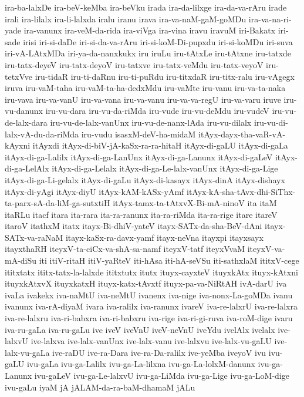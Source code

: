 {ira-ba-lalxDe
ira-beV-keMba
ira-beVku
irada
ira-da-lilxge
ira-da-va-rAru
irade
irali
ira-lilalx
ira-li-lalxda
iralu
iranu
irava
ira-va-naM-gaM-goMDu
ira-va-na-ri-yade
ira-vanunx
ira-veM-da-rida
ira-viVga
ira-vina
iravu
iravuM
iri-Bakatx
iri-sade
irisi
iri-si-daDe
iri-si-da-va-rAru
iri-si-koM-Di-pupxdu
iri-si-koMDu
iri-suva
iri-vA-LAtxMDa
iri-ya-da-nanxkukx
iru
iruLu
iru-tAtxLe
iru-tAtxne
iru-tatxde
iru-tatx-deyeV
iru-tatx-deyoV
iru-tatxve
iru-tatx-veMdu
iru-tatx-veyoV
iru-tetxVve
iru-tidaR
iru-ti-daRnu
iru-ti-puRdu
iru-titxdaR
iru-titx-ralu
iru-vAgegx
iruva
iru-vaM-taha
iru-vaM-ta-ha-dedxMdu
iru-vaMte
iru-vanu
iru-va-ta-naka
iru-vava
iru-va-vanU
iru-va-vana
iru-va-vanu
iru-va-va-regU
iru-va-varu
iruve
iru-vu-danunx
iru-vu-dara
iru-vu-da-riMda
iru-vude
iru-vu-deMdu
iru-vudeV
iru-vu-de-lalx-dara
iru-vu-de-lalx-vanUnx
iru-vu-de-nanx-lAda
iru-vu-dilalx
iru-vu-di-lalx-vA-du-da-riMda
iru-vudu
isasxM-deV-ha-midaM
itAyx-dayx-tha-vaR-vA-kAyxni
itAyxdi
itAyx-di-biV-jA-kaSx-ra-ra-hitaH
itAyx-di-gaLU
itAyx-di-gaLa
itAyx-di-ga-Lalilx
itAyx-di-ga-LanUnx
itAyx-di-ga-Lanunx
itAyx-di-gaLeV
itAyx-di-ga-LelAlx
itAyx-di-ga-Lelalx
itAyx-di-ga-Le-lalx-vanUnx
itAyx-di-ga-Lige
itAyx-di-ga-Li-gelalx
itAyx-di-gaLu
itAyx-di-kasayx
itAyx-dinA
itAyx-dishayx
itAyx-di-yAgi
itAyx-diyU
itAyx-kAM-kASx-yAmf
itAyx-kA-sha-tAvx-dhi-SiThx-ta-parx-sA-da-liM-ga-sutxtiH
itAyx-tamx-ta-tAtxvX-Bi-mA-ninoV
ita
itaM
itaRLu
itacf
itara
ita-rara
ita-ra-ranunx
ita-ra-riMda
ita-ra-rige
itare
itareV
itaroV
itathxM
itatx
itayx-Bi-dhiV-yateV
itayx-SATx-da-sha-BeV-dAni
itayx-SATx-va-raNaM
itayx-kaSx-ra-davx-yamf
itayx-neVna
itayxpi
itayxsayx
itayxthaRH
iteyxV-ta-ciCx-va-shA-sa-namf
iteyxV-tatf
iteyxVvaM
iteyxV-va-mA-diSu
iti
itiV-ritaH
itiV-yaRteV
iti-hAsa
iti-hA-seVSu
iti-sathxlaM
ititxV-cege
ititxtatx
ititx-tatx-la-lalxde
ititxtutx
itutx
ituyx-cayxteV
ituyxkAtx
ituyx-kAtxni
ituyxkAtxvX
ituyxkatxH
ituyx-katx-tAvxtf
ituyx-pa-va-NiRtAH
ivA-darU
iva
ivaLa
ivakekx
iva-naMtU
iva-neMtU
ivanenx
iva-nige
iva-nonx-La-goMDa
ivanu
ivanunx
iva-rA-diyaM
ivara
iva-ralilx
iva-ranunx
ivareV
iva-re-lalxrU
iva-re-lalxra
iva-re-lalxru
iva-ri-babxra
iva-ri-babxru
iva-rige
iva-ri-gi-ruva
iva-roM-dige
ivaru
iva-ru-gaLa
iva-ru-gaLu
ive
iveV
iveVnU
iveV-neVnU
iveYdu
ivelAlx
ivelalx
ive-lalxvU
ive-lalxva
ive-lalx-vanUnx
ive-lalx-vanu
ive-lalxvu
ive-lalx-vu-gaLU
ive-lalx-vu-gaLa
ive-raDU
ive-ra-Dara
ive-ra-Da-ralilx
ive-yeMba
iveyoV
ivu
ivu-gaLU
ivu-gaLa
ivu-ga-Lalilx
ivu-ga-La-lilxna
ivu-ga-La-lolxM-danunx
ivu-ga-Lanunx
ivu-gaLeV
ivu-ga-Le-lalxvU
ivu-ga-LiMda
ivu-ga-Lige
ivu-ga-LoM-dige
ivu-gaLu
iyaM
jA
jALAM-da-ra-baM-dhamaM
jALu
}
